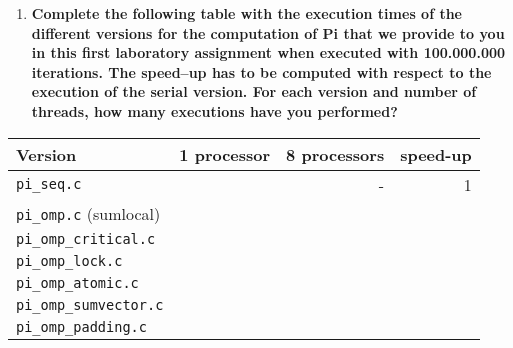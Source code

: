 \documentclass[a4paper]{article}
\begin{document}
\begin{enumerate}[resume]
	\item \textbf{ Complete the following table with the execution times of the different versions for the computation of Pi that we provide to you in this first laboratory assignment when executed with 100.000.000 iterations. The speed–up has to be computed with respect to the execution of the serial version. For each version and number of threads, how many executions have you performed? }
\end{enumerate}

\begin{table}[H]
	\centering
	\begin{tabular}{l|rrr}
		\textbf{Version} & \textbf{1 processor} & \textbf{8 processors} & \textbf{speed-up} \\
		\hline
		\verb|pi_seq.c| & & - & 1 \\
		\verb|pi_omp.c| (sumlocal) & & & \\
		\verb|pi_omp_critical.c| & & & \\
		\verb|pi_omp_lock.c| & & & \\
		\verb|pi_omp_atomic.c|  & & & \\
		\verb|pi_omp_sumvector.c| & & & \\
		\verb|pi_omp_padding.c| & & & \\
	\end{tabular}
\end{table}
\end{document}
